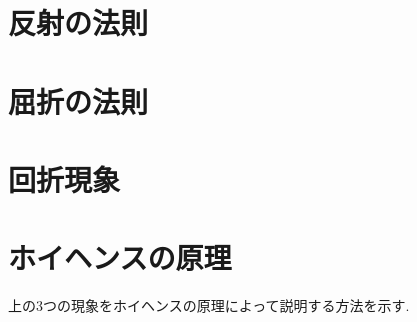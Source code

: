 \section{反射の法則}
\section{屈折の法則}
\section{回折現象}
\section{ホイヘンスの原理}
上の3つの現象をホイヘンスの原理によって説明する方法を示す.




















